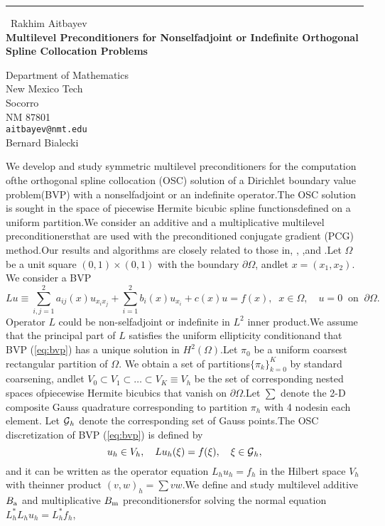 \documentclass{report}
\begin{document}
\begin{center}
\rule{6in}{1pt} \
{\large Rakhim Aitbayev \\
{\bf Multilevel Preconditioners for Nonselfadjoint or Indefinite Orthogonal Spline Collocation Problems}}

Department of Mathematics \\ New Mexico Tech \\ Socorro \\ NM 87801
\\
{\tt aitbayev@nmt.edu}\\
Bernard Bialecki\end{center}

\newtheorem*{theorem}{Theorem}\newcommand{\GP}{\mbox{${\cal G}$}}\newcommand{\SH}{\mbox{$\scriptscriptstyle H^{2}(\Omega)$}}\newcommand{\SL}{\mbox{$\scriptscriptstyle L^{2}(\Omega)$}}We develop and study symmetric multilevel preconditioners for the computation ofthe orthogonal spline collocation (OSC) solution of a Dirichlet boundary value problem(BVP) with a nonselfadjoint or an indefinite operator.The OSC solution is sought in the space of piecewise Hermite bicubic spline functionsdefined on a uniform partition.We consider an additive and a multiplicative multilevel preconditionersthat are used with the preconditioned conjugate gradient (PCG) method.Our results and algorithms are closely related to those in\cite{Aitbayev_Bialecki_2003},
\cite{Bialecki_1998},
\cite{Bialecki_Dryja_1997},and \cite{SBG_1996}.Let $\Omega$ be a unit square $(0,1)\times(0,1)$ with the boundary $\partial\Omega$,
andlet $x=(x_1,x_2)$.
We consider a BVP\begin{equation}\label{eq:bvp}Lu\equiv\sum_{i,j=1}^{2} a_{ij}(x)u_{x_ix_j}+\sum_{i=1}^{2} b_i(x) u_{x_i}+c(x)u = f(x),\;\;x\in\Omega,\quad u=0 \;\;\mbox{on}\;\;\partial\Omega.\end{equation}Operator $L$ could be non-selfadjoint or indefinite in $L^2$ inner product.We assume that the principal part of $L$ satisfies the uniform ellipticity conditionand that BVP (\ref{eq:bvp}) has a unique solution in $H^2(\Omega)$.Let $\pi_0$ be a uniform coarsest rectangular partition of $\Omega$.
We obtain a set of partitions$\{\pi_k\}_{k=0}^{K}$ by standard coarsening,
andlet $V_0\subset V_1\subset\ldots\subset V_K\equiv V_h$ be the set of corresponding nested spaces ofpiecewise Hermite bicubics that vanish on $\partial\Omega$.Let $\sum$ denote the 2-D composite Gauss quadrature corresponding to partition $\pi_h$ with 4 nodesin each element.
Let $\GP_h$ denote the corresponding set of Gauss points.The OSC discretization of BVP (\ref{eq:bvp}) is defined by\begin{equation}\label{eq:osc}u_h\in V_h,\quad Lu_h(\xi)=f(\xi),\quad\xi\in\GP_h,\end{equation}and it can be written as the operator equation $L_hu_h=f_h$ in the Hilbert space $V_h$ with theinner product $(v,w)_h=\sum vw$.We define and study multilevel additive$B_{\textup{\scriptsize a}}$ and multiplicative $B_{\textup{\scriptsize m}}$ preconditionersfor solving the normal equation $L_h^*L_hu_h=L_h^*f_h$,
\end{document}
